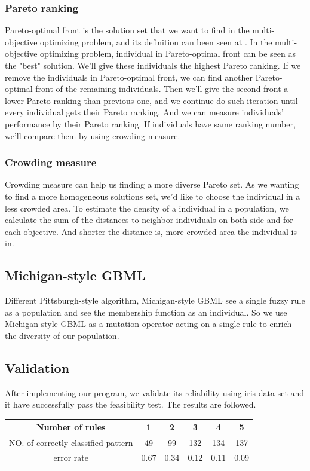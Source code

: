 \documentclass[conference]{IEEEtran}
\begin{document}
	 
	 \subsubsection{Pareto ranking}
	 \par
	 Pareto-optimal front is the solution set that we want to find in the multi-objective optimizing problem, and its definition can been seen at \cite{ISHIBUCHI20074}. In the multi-objective optimizing problem, individual in Pareto-optimal front can be seen as the "best" solution. We'll give these individuals the highest Pareto ranking. If we remove the individuals in Pareto-optimal front, we can find another Pareto-optimal front of the remaining individuals. Then we'll give the second front a lower Pareto ranking than previous one, and we continue do such iteration until every individual gets their Pareto ranking. And we can measure individuals' performance by their Pareto ranking. If individuals have same ranking number, we'll compare them by using crowding measure.
	 
	 \subsubsection{Crowding measure}
	 \par
	 Crowding measure can help us finding a more diverse Pareto set. As we wanting to find a more homogeneous solutions set, we'd like to choose the individual in a less crowded area. To estimate the density of a individual in a population, we calculate the sum of the distances to neighbor individuals on both side and for each objective. And shorter the distance is, more crowded area the individual is in.     
	 
	 \subsection{Michigan-style GBML}
	 \par
	 Different Pittsburgh-style algorithm, Michigan-style GBML see a single fuzzy rule as a population and see the membership function as an individual. So we use Michigan-style GBML as a mutation operator acting on a single rule to enrich the diversity of our population. 
	 \subsection{Validation}
	 After implementing our program, we validate its reliability using iris data set and it have successfully pass the feasibility test. The results are followed.
	 \\
	 \begin{tabular}{cccccc}
	 	\hline
	 	Number of rules& 1& 2&3&4&5\\
	 	\hline
	 	NO. of correctly classified pattern& 49& 99&132&134&137\\
	 	\hline
	 	error rate&0.67&0.34&0.12&0.11&0.09\\
	 	\hline
	 \end{tabular}
\end{document}
